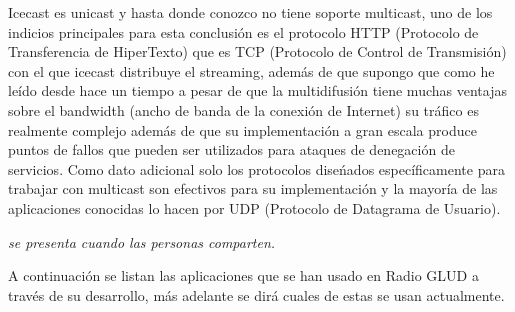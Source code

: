 \begin{multicols}{2}
Icecast es unicast y hasta donde conozco no tiene soporte multicast, uno de los indicios principales para esta conclusión es el protocolo HTTP (Protocolo de Transferencia de HiperTexto) que es TCP (Protocolo de Control de Transmisión) con el que icecast distribuye el streaming, además de que supongo que como he leído desde hace un tiempo a pesar de que la multidifusión tiene muchas ventajas sobre el bandwidth (ancho de banda de la conexión de Internet) su tráfico es realmente complejo además de que su implementación a gran escala produce puntos de fallos que pueden ser utilizados para ataques de denegación de servicios. Como dato adicional solo los protocolos diseńados específicamente para trabajar con multicast son efectivos para su implementación y la mayoría de las aplicaciones conocidas lo hacen por UDP (Protocolo de Datagrama de Usuario).

\begin{entradilla} %
{\em {\color{introcolor}{Poder Social}} se presenta cuando las personas comparten.}
\end{entradilla}


A continuación se listan las aplicaciones que se han usado en Radio GLUD a través de su desarrollo, más adelante se dirá cuales de estas se usan actualmente.


\end{multicols}
